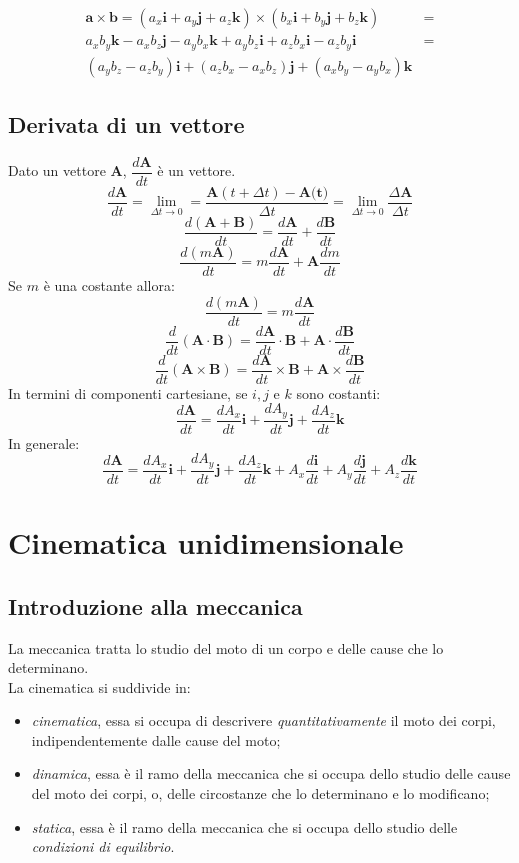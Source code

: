 \documentclass[12pt]{report}
\begin{document}
	\begin{align*}
	\textbf{a} \times \textbf{b} = (a_x\textbf{i}+ a_y\textbf{j}+ a_z\textbf{k}) \times (b_x\textbf{i} + b_y\textbf{j} + b_z\textbf{k}) &= \\ a_xb_y\textbf{k} - a_xb_z\textbf{j} - a_yb_x\textbf{k} + a_yb_z \textbf{i} + a_zb_x\textbf{i} - a_zb_y\textbf{i} &= \\ (a_yb_z - a_zb_y)\textbf{i} + (a_zb_x - a_xb_z)\textbf{j} + (a_xb_y - a_yb_x)\textbf{k}
	\end{align*}
	\section{Derivata di un vettore}
	Dato un vettore \textbf{A}, $\dfrac{d\textbf{A}}{dt}$ è  un vettore.
	\[
	\frac{d\textbf{A}}{dt} = \lim_{\Delta t \to 0} = \frac{\textbf{A}(t + \Delta t) - \textbf{A(t)}}{\Delta t} = \lim_{\Delta t \to 0} \frac{\Delta \textbf{A}}{\Delta t}
	\]
	\[
	\frac{d(\textbf{A} + \textbf{B})}{dt} = \frac{d\textbf{A}}{dt} + \frac{d\textbf{B}}{dt}
	\]
	\[
	\frac{d(m\textbf{A})}{dt} = m\frac{d\textbf{A}}{dt} + \textbf{A}\frac{dm}{dt}
	\]
	Se $m$ è  una costante allora:
	\[
	\frac{d(m\textbf{A})}{dt} = m\frac{d\textbf{A}}{dt}
	\]
	\[
	\frac{d}{dt}(\textbf{A} \cdot \textbf{B}) = \frac{d\textbf{A}}{dt}\cdot \textbf{B} + \textbf{A} \cdot \frac{d\textbf{B}}{dt}
	\]
	\[
	\frac{d}{dt}(\textbf{A} \times \textbf{B}) = \frac{d\textbf{A}}{dt} \times \textbf{B} + \textbf{A} \times \frac{d\textbf{B}}{dt}
	\]
	In termini di componenti cartesiane, se $i, j$ e $k$ sono costanti:
	\[
	\frac{d\textbf{A}}{dt} = \frac{dA_x}{dt}\textbf{i} + \frac{dA_y}{dt}\textbf{j} + \frac{dA_z}{dt}\textbf{k}
	\]
	In generale:
	\[
	\frac{d\textbf{A}}{dt} = \frac{dA_x}{dt}\textbf{i} + \frac{dA_y}{dt}\textbf{j} + \frac{dA_z}{dt}\textbf{k} + A_x\frac{d\textbf{i}}{dt} + A_y\frac{d\textbf{j}}{dt} + A_z\frac{d\textbf{k}}{dt}
	\]
	\chapter{Cinematica unidimensionale}
	\section{Introduzione alla meccanica}
	La meccanica tratta lo studio del moto di un corpo e delle cause che lo determinano. \\
	La cinematica si suddivide in:
	\begin{itemize}
		\item \textit{cinematica}, essa si occupa di descrivere \textit{quantitativamente} il moto dei corpi, indipendentemente dalle cause del moto;
		\item \textit{dinamica}, essa è  il ramo della meccanica che si occupa dello studio delle cause del moto dei corpi, o, delle circostanze che lo determinano e lo modificano;
		\item \textit{statica}, essa è  il ramo della meccanica che si occupa dello studio delle \textit{condizioni di equilibrio}.
	\end{itemize}
\end{document}
